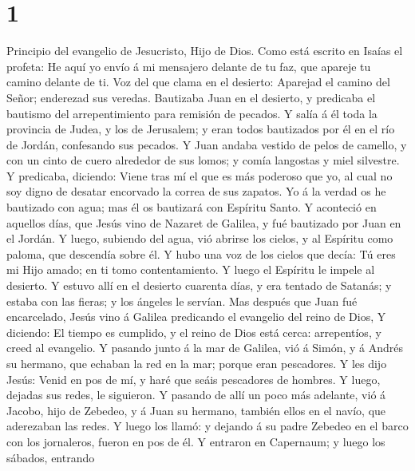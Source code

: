 \hypertarget{section}{%
\section{1}\label{section}}

 Principio del evangelio de Jesucristo, Hijo de Dios.
 Como está escrito en Isaías el profeta: He aquí yo envío
á mi mensajero delante de tu faz, que apareje tu camino delante de ti.
 Voz del que clama en el desierto: Aparejad el camino del
Señor; enderezad sus veredas.  Bautizaba Juan en el
desierto, y predicaba el bautismo del arrepentimiento para remisión de
pecados.  Y salía á él toda la provincia de Judea, y los
de Jerusalem; y eran todos bautizados por él en el río de Jordán,
confesando sus pecados.  Y Juan andaba vestido de pelos de
camello, y con un cinto de cuero alrededor de sus lomos; y comía
langostas y miel silvestre.  Y predicaba, diciendo: Viene
tras mí el que es más poderoso que yo, al cual no soy digno de desatar
encorvado la correa de sus zapatos.  Yo á la verdad os he
bautizado con agua; mas él os bautizará con Espíritu Santo.
 Y aconteció en aquellos días, que Jesús vino de Nazaret
de Galilea, y fué bautizado por Juan en el Jordán.  Y
luego, subiendo del agua, vió abrirse los cielos, y al Espíritu como
paloma, que descendía sobre él.  Y hubo una voz de los
cielos que decía: Tú eres mi Hijo amado; en ti tomo contentamiento.
 Y luego el Espíritu le impele al desierto.
 Y estuvo allí en el desierto cuarenta días, y era
tentado de Satanás; y estaba con las fieras; y los ángeles le servían.
 Mas después que Juan fué encarcelado, Jesús vino á
Galilea predicando el evangelio del reino de Dios,  Y
diciendo: El tiempo es cumplido, y el reino de Dios está cerca:
arrepentíos, y creed al evangelio.  Y pasando junto á la
mar de Galilea, vió á Simón, y á Andrés su hermano, que echaban la red
en la mar; porque eran pescadores.  Y les dijo Jesús:
Venid en pos de mí, y haré que seáis pescadores de hombres.
 Y luego, dejadas sus redes, le siguieron.
 Y pasando de allí un poco más adelante, vió á Jacobo,
hijo de Zebedeo, y á Juan su hermano, también ellos en el navío, que
aderezaban las redes.  Y luego los llamó: y dejando á su
padre Zebedeo en el barco con los jornaleros, fueron en pos de él.
 Y entraron en Capernaum; y luego los sábados, entrando
